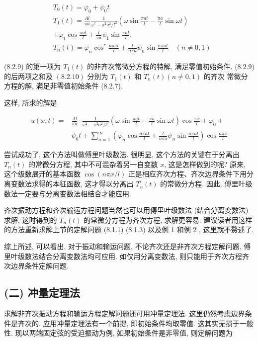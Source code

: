 $$
\begin{aligned}
& T_{0}(t)=\varphi_{0}+\psi_{0} t \\
& T_{1}(t)=\frac{A l}{\pi a} \frac{1}{\omega^{2}-\pi^{2} a^{2} / l^{2}}\left(\omega \sin \frac{\pi a t}{l}-\frac{\pi a}{l} \sin \omega t\right) \\
&+\varphi_{1} \cos \frac{\pi a t}{l}+\frac{l}{\pi a} \psi_{1} \sin \frac{\pi a t}{l}, \\
& T_{n}(t)=\varphi_{n} \cos ^{*} \frac{n \pi a t}{l}+\frac{l}{n \pi a} \psi_{n} \sin \frac{n \pi a t}{l} \quad(n \neq 0,1)
\end{aligned}
$$

(8.2.9) 的第一项为 $T_{1}(t)$ 的非齐次常微分方程的特解, 满足零值初始条件. (8.2.9) 的后两项之和及 $(8.2 .10)$ 分别为 $T_{1}(t)$ 和 $T_{n}(t)(n \neq 0,1)$ 的齐次
常微分方程的解, 满足非零值初始条件 (8.2.7).

这样, 所求的解是

$$
\begin{aligned}
u(x, t)= & \frac{A l}{\pi a} \cdot \frac{1}{\omega^{2}-\pi^{2} a^{2} / l^{2}}\left(\omega \sin \frac{\pi a t}{l}-\frac{\pi a}{l} \sin \omega t\right) \cos \frac{\pi x}{l}+\varphi_{0}+ \\
& \psi_{0} t+\sum_{n=1}^{\infty}\left(\varphi_{n} \cos \frac{n \pi a t}{l}+\frac{l}{n \pi a} \psi_{n} \sin \frac{n \pi a t}{l}\right) \cos \frac{n \pi x}{l}
\end{aligned}
$$

尝试成功了, 这个方法叫做傅里叶级数法. 很明显, 这个方法的关键在于分离出 $T_{n}(t)$ 的常微分方程, 其中不可混杂着另一自变数 $x$, 这是怎样做到的呢? 原来, 这个级数展开的基本函数 $\cos (n \pi x / l)$ 正是相应齐次方程、齐次边界条件下用分离变数法求得的本征函数, 这才得以分离出 $T_{n}(t)$ 的常微分方程. 因此, 傅里叶级数法一定要与分离变数法相结合才能应用.

齐次振动方程和齐次输运方程问题当然也可以用傅里叶级数法 (结合分离变数法) 求解, 这时得到的 $T_{n}(t)$ 的常微分方程为齐次方程, 求解更容易. 建议读者用这样的方法重新求解上节的定解问题 (8.1.1) (8.1.3) 以及例 1 和例 2 , 这里就不赘述了.

综上所述, 可以看出, 对于振动和输运问题, 不论齐次还是非齐次方程定解问题, 傅里叶级数法结合分离变数法均可应用. 如仅用分离变数法, 则只能用于齐次方程齐次边界条件定解问题.

\subsection{(二) 冲量定理法}
求解非齐次振动方程和输运方程定解问题还可用冲量定理法. 这里仍然考虑边界条件是齐次的. 应用冲量定理法有一个前提, 即初始条件均取零值. 这其实无损于一般性. 现以两端固定弦的受迫振动为例, 如果初始条件是非零值, 则定解问题为

